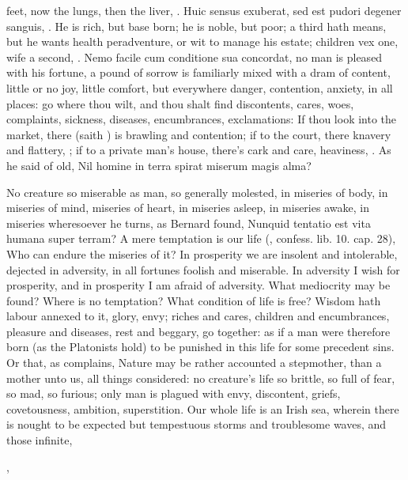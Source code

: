 {{feet, now the lungs, then the liver, \etc{}. Huic sensus exuberat, sed est
pudori degener sanguis, \etc{}. He is rich, but base born; he is noble, but
poor; a third hath means, but he wants health peradventure, or wit to
manage his estate; children vex one, wife a second, \etc{}. Nemo facile cum
conditione sua concordat, no man is pleased with his fortune, a pound
of sorrow is familiarly mixed with a dram of content, little or no joy,
little comfort, but everywhere danger, contention, anxiety, in
all places: go where thou wilt, and thou shalt find discontents, cares,
woes, complaints, sickness, diseases, encumbrances, exclamations: If
thou look into the market, there (saith  \Chrysostom{}) is brawling
and contention; if to the court, there knavery and flattery, \etc{}; if to
a private man's house, there's cark and care, heaviness, \etc{}. As he said
of old,
Nil homine in terra spirat miserum magis alma?

No creature so miserable as man, so generally molested, in
miseries of body, in miseries of mind, miseries of heart, in miseries
asleep, in miseries awake, in miseries wheresoever he turns, as Bernard
found, Nunquid tentatio est vita humana super terram? A mere temptation
is our life (\Austin{}, confess. lib. 10. cap. 28),  Who can endure
the miseries of it? In prosperity we are insolent and
intolerable, dejected in adversity, in all fortunes foolish and
miserable. In adversity I wish for prosperity, and in prosperity
I am afraid of adversity. What mediocrity may be found? Where is no
temptation? What condition of life is free? Wisdom hath labour
annexed to it, glory, envy; riches and cares, children and
encumbrances, pleasure and diseases, rest and beggary, go together: as
if a man were therefore born (as the Platonists hold) to be punished in
this life for some precedent sins. Or that, as \Pliny{} complains,
Nature may be rather accounted a stepmother, than a mother unto us, all
things considered: no creature's life so brittle, so full of fear, so
mad, so furious; only man is plagued with envy, discontent, griefs,
covetousness, ambition, superstition. Our whole life is an Irish sea,
wherein there is nought to be expected but tempestuous storms and
troublesome waves, and those infinite,

,

}}
